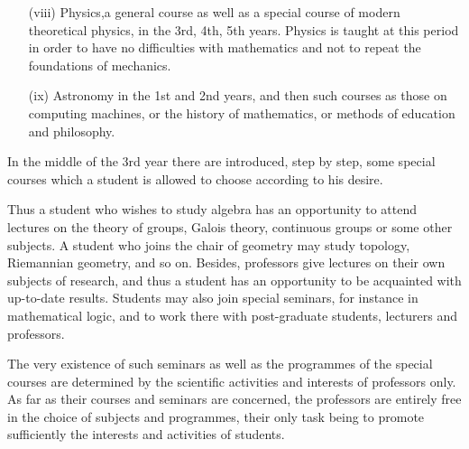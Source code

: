 \setcounter{pageoriginal}{105}
\begin{itemize}
\item[(viii)] Physics,\pageoriginale a general course as well as a special course of modern theoretical physics, in the 3rd, 4th, 5th years. Physics is taught at this period in order to have no difficulties with mathematics and not to repeat the foundations of mechanics.

\item[(ix)] Astronomy in the 1st and 2nd years, and then such courses as those on computing machines, or the history of mathematics, or methods of education and philosophy.
\end{itemize}

In the middle of the 3rd year there are introduced, step by step, some special courses which a student is allowed to choose according to his desire.

Thus a student who wishes to study algebra has an opportunity to attend lectures on the theory of groups, Galois theory, continuous groups or some other subjects. A student who joins the chair of geometry may study topology, Riemannian geometry, and so on. Besides, professors give lectures on their own subjects of research, and thus a student has an opportunity to be acquainted with up-to-date results. Students may also join special seminars, for instance in mathematical logic, and to work there with post-graduate students, lecturers and professors.

The very existence of such seminars as well as the programmes of the special courses are determined by the scientific activities and interests of professors only. As far as their courses and seminars are concerned, the professors are entirely free in the choice of subjects and programmes, their only task being to promote sufficiently the interests and activities of students.

